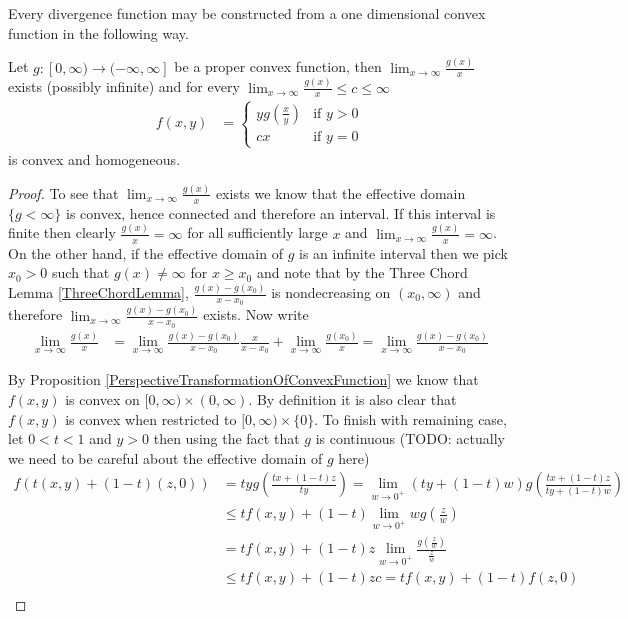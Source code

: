 Every divergence function may be constructed from a one dimensional convex function in the following way.
\begin{prop}\label{ConvexHomogeneousFunctionFromConvexFunction}Let $g : [0, \infty) \to (-\infty, \infty]$ be a proper convex function, then $\lim_{x \to \infty} \frac{g(x)}{x}$ exists (possibly infinite) and for every $\lim_{x \to \infty} \frac{g(x)}{x}  \leq c \leq \infty$ 
\begin{align*}
f(x,y) &= \begin{cases}
y g \left( \frac{x}{y} \right ) & \text{if $y >0$} \\
c x & \text{if $y=0$}
\end{cases}
\end{align*}
is convex and homogeneous.
\end{prop}
\begin{proof}
To see that $\lim_{x \to \infty} \frac{g(x)}{x}$ exists we know that the effective domain $\lbrace g < \infty \rbrace$ is convex, hence connected and therefore an interval.  If this interval is finite then clearly $\frac{g(x)}{x} = \infty$ for all sufficiently large $x$ and $\lim_{x \to \infty} \frac{g(x)}{x}=\infty$.  On the other hand, if the effective domain of $g$ is an infinite interval then we pick $x_0 > 0$ such that $g(x) \neq \infty$ for $x \geq x_0$ and note that by the Three Chord Lemma \ref{ThreeChordLemma}, $\frac{g(x) - g(x_0)}{x - x_0}$ is nondecreasing on $(x_0, \infty)$ and therefore $\lim_{x \to \infty} \frac{g(x) - g(x_0)}{x - x_0}$ exists.  Now write
\begin{align*}
\lim_{x \to \infty} \frac{g(x)}{x} &= \lim_{x \to \infty} \frac{g(x) -g(x_0)}{x-x_0}\frac{x}{x-x_0} + \lim_{x \to \infty} \frac{g(x_0)}{x} = \lim_{x \to \infty} \frac{g(x) -g(x_0)}{x-x_0}
\end{align*}

By Proposition \ref{PerspectiveTransformationOfConvexFunction} we know that $f(x,y)$ is convex on $[0,\infty) \times (0, \infty)$.  By definition it is also clear that $f(x,y)$ is convex when restricted to $[0, \infty) \times \lbrace 0 \rbrace$.  To finish with remaining case, let $0 < t < 1$ and $y > 0$ then using the fact that $g$ is continuous (TODO: actually we need to be careful about the effective domain of $g$ here)
\begin{align*}
f( t (x,y) + (1-t) (z,0)) &= t y g \left( \frac{tx + (1-t) z}{ty} \right) = \lim_{w \to 0^+} (t y + (1-t)w) g \left( \frac{tx + (1-t) z}{ty + (1-t) w} \right) \\
&\leq t f(x,y) + (1-t) \lim_{w \to 0^+} w g\left( \frac{z}{w} \right) \\
&= t f(x,y) + (1-t) z \lim_{w \to 0^+} \frac{g\left( \frac{z}{w} \right)}{\frac{z}{w} } \\
&\leq t f(x,y) + (1-t) z c = t f(x,y) + (1-t) f(z,0) \\
\end{align*}
\end{proof}

